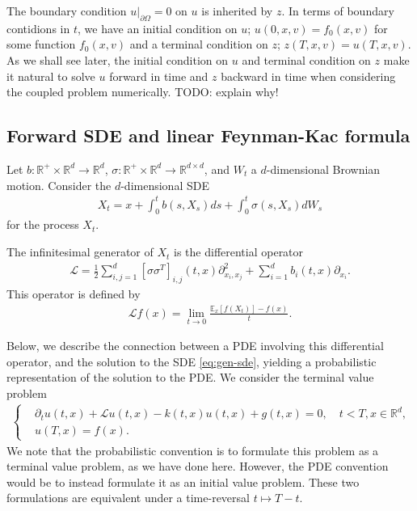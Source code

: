 \documentclass{article}  %
\begin{document}
The boundary condition ${u \rvert}_{\partial \Omega} = 0$ on $u$ is inherited by $z$. In terms of boundary contidions in $t$, we have an initial condition on $u$; $u(0,x,v)=f_0(x,v)$ for some function $f_0(x,v)$ and a terminal condition on $z$; $z(T,x,v)=u(T,x,v)$. As we shall see later, the initial condition on $u$ and terminal condition on $z$ make it natural to solve $u$ forward in time and $z$ backward in time when considering the coupled problem numerically.
TODO: explain why!

\subsection{Forward SDE and linear Feynman-Kac formula}

Let $b:\mathbb{R}^+ \times \mathbb{R}^d \rightarrow \mathbb{R}^d$, $\sigma:\mathbb{R}^+ \times \mathbb{R}^d \rightarrow \mathbb{R}^{d \times d}$, and $W_t$ a $d$-dimensional Brownian motion. Consider the $d$-dimensional SDE
%
\begin{align}
    \label{eq:gen-sde}
X_t = x + \int_0^t b(s,X_s) ds + \int_0^t \sigma(s,X_s)dW_s
\end{align}
%
for the process $X_t$. 

The infinitesimal generator of $X_t$ is the differential operator 
%
\begin{align}
    \label{eq:generator-operator}
    \mathcal{L} = \frac{1}{2} \sum_{i,j=1}^d [\sigma \sigma^T]_{i,j}(t,x) \partial_{x_i,x_j}^2 + \sum_{i=1}^d b_i(t,x) \partial_{x_i}.
\end{align}
%
This operator is defined by
%
\begin{align} 
    \mathcal{L}f(x) = \lim_{t\rightarrow 0} \frac{\mathbb{E}_x[f(X_t)]-f(x)}{t}.
\end{align}
%

Below, we describe the connection between a PDE involving this differential operator, and the solution to the SDE \autoref{eq:gen-sde}, yielding a probabilistic representation of the solution to the PDE. We consider the terminal value problem
%
\begin{align}
    \label{eq:backward-pde}
    \begin{cases}
    &\partial_t u(t,x) + \mathcal{L}u(t,x) - k(t,x)u(t,x) + g(t,x) = 0, \quad t<T,x \in \mathbb{R}^d, \\
    &u(T,x) = f(x).
    \end{cases}
\end{align}
%
We note that the probabilistic convention is to formulate this problem as a terminal value problem, as we have done here. However, the PDE convention would be to instead formulate it as an initial value problem. These two formulations are equivalent under a time-reversal $t \mapsto T-t$. 
\end{document}
